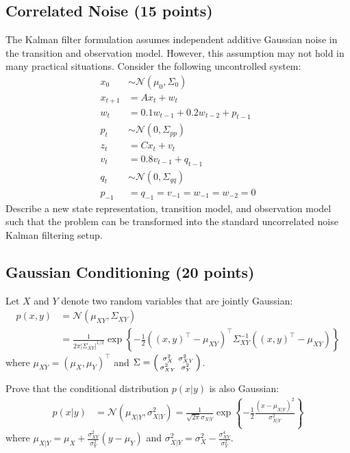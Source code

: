 \documentclass{article}
\newcommand{\?}{\stackrel{?}{=}}
\begin{document}
\clearpage

\subsection{Correlated Noise (15 points)}

The Kalman filter formulation assumes independent additive Gaussian noise in the transition and observation model.
However, this assumption may not hold in many practical situations.
Consider the following uncontrolled system:
\begin{align*}
  x_0 &\sim \mathcal{N}(\mu_0, \Sigma_0) \\
  x_{t+1} &= A x_t + w_t \\
  w_{t} &= 0.1 w_{t-1} + 0.2 w_{t-2} + p_{t-1} \\
  p_t &\sim \mathcal{N}(0, \Sigma_{pp}) \\
  z_t &= Cx_t + v_t \\
  v_t &= 0.8 v_{t-1} + q_{t-1} \\
  q_t &\sim \mathcal{N}(0, \Sigma_{qq}) \\
  p_{-1} &= q_{-1} = v_{-1} = w_{-1} = w_{-2} = 0
\end{align*}
Describe a new state representation, transition model, and observation model such that the problem can be transformed into the standard uncorrelated noise Kalman filtering setup.


\subsection{Gaussian Conditioning (20 points)}

Let $X$ and $Y$ denote two random variables that are jointly Gaussian:
\begin{align*}
  p(x, y)
  &= \mathcal{N}(\mu_{XY}, \Sigma_{XY}) \\
  &= \frac{1}{2 \pi |\Sigma_{XY}|^{1/2}}
    \exp \left\{ -\frac{1}{2} ((x, y)^\top - \mu_{XY})^\top \Sigma_{XY}^{-1} ((x, y)^\top - \mu_{XY}) \right\}
\end{align*}
where $\mu_{XY} = (\mu_{X}, \mu_{Y})^\top$ and
$\Sigma = \begin{psmallmatrix} \sigma_X^2 & \sigma_{XY}^2 \\ \sigma_{XY}^2 & \sigma_Y^2 \end{psmallmatrix}$.

\bigskip
Prove that the conditional distribution $p(x|y)$ is also Gaussian:
\begin{align*}
  p(x|y)
  &= \mathcal{N}(\mu_{X|Y}, \sigma_{X|Y}^2)
    = \frac{1}{\sqrt{2\pi}\sigma_{X|Y}} \exp \left\{ -\frac{1}{2} \frac{(x - \mu_{X|Y})^2}{\sigma_{X|Y}^2} \right\}
\end{align*}
where $\mu_{X|Y} = \mu_{X} + \frac{\sigma_{XY}^2}{\sigma_{Y}^2} (y - \mu_{Y})$ and
$\sigma_{X|Y}^2 = \sigma_X^2 - \frac{\sigma_{XY}^4}{\sigma_Y^2}$.
\end{document}
